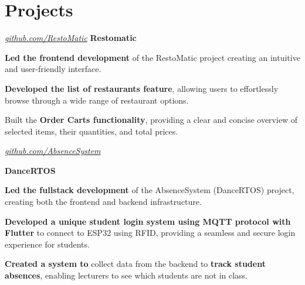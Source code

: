 \documentclass[../main.tex]{subfiles}
\begin{document}
\section{Projects}


\begin{twocolentry}{
		\small
		\textit{\href{https://github.com/SistemBasisData2023/RestoMatic}{github.com/RestoMatic}}}
	\textbf{Restomatic}
\end{twocolentry}

\vspace{0.10 cm}
\begin{onecolentry}
	\begin{highlights}
		\item \textbf{Led the frontend development} of the RestoMatic project creating an intuitive and user-friendly interface.
		\item \textbf{Developed the list of restaurants feature}, allowing users to effortlessly browse through a wide range of restaurant options.
		\item Built the \textbf{Order Carts functionality}, providing a clear and concise overview of selected items, their quantities, and total prices.
	\end{highlights}
\end{onecolentry}


\vspace{0.2 cm}

\begin{twocolentry}{
		\small

		\textit{\href{https://github.com/cattyman919/AbsenceSystem/tree/main}{github.com/AbsenceSystem}}}
	\textbf{DanceRTOS}
\end{twocolentry}

\vspace{0.10 cm}
\begin{onecolentry}
	\begin{highlights}
		\item \textbf{Led the fullstack development} of the AbsenceSystem (DanceRTOS) project, creating both the frontend and backend infrastructure.
		\item \textbf{Developed a unique student login system using MQTT protocol with Flutter} to connect to ESP32 using RFID, providing a seamless and secure login experience for students.
		\item \textbf{Created a system to} collect data from the backend to \textbf{track student absences}, enabling lecturers to see which students are not in class.
	\end{highlights}
\end{onecolentry}
\end{document}
